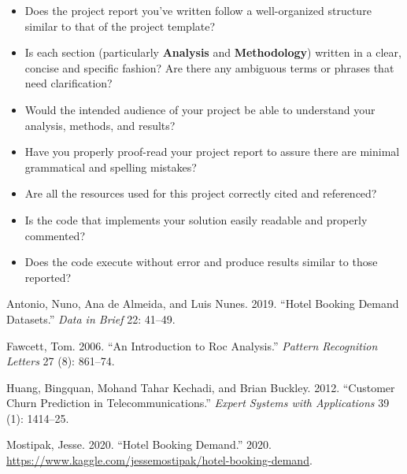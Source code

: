 \documentclass[
]{article}
\providecommand{\tightlist}{%
  \setlength{\itemsep}{0pt}\setlength{\parskip}{0pt}}
\begin{document}
\begin{itemize}
\tightlist
\item
  Does the project report you've written follow a well-organized
  structure similar to that of the project template?
\item
  Is each section (particularly \textbf{Analysis} and
  \textbf{Methodology}) written in a clear, concise and specific
  fashion? Are there any ambiguous terms or phrases that need
  clarification?
\item
  Would the intended audience of your project be able to understand your
  analysis, methods, and results?
\item
  Have you properly proof-read your project report to assure there are
  minimal grammatical and spelling mistakes?
\item
  Are all the resources used for this project correctly cited and
  referenced?
\item
  Is the code that implements your solution easily readable and properly
  commented?
\item
  Does the code execute without error and produce results similar to
  those reported?
\end{itemize}

\hypertarget{refs}{}
\leavevmode\hypertarget{ref-antonio2019hotel}{}%
Antonio, Nuno, Ana de Almeida, and Luis Nunes. 2019. ``Hotel Booking
Demand Datasets.'' \emph{Data in Brief} 22: 41--49.

\leavevmode\hypertarget{ref-fawcett2006introduction}{}%
Fawcett, Tom. 2006. ``An Introduction to Roc Analysis.'' \emph{Pattern
Recognition Letters} 27 (8): 861--74.

\leavevmode\hypertarget{ref-huang2012customer}{}%
Huang, Bingquan, Mohand Tahar Kechadi, and Brian Buckley. 2012.
``Customer Churn Prediction in Telecommunications.'' \emph{Expert
Systems with Applications} 39 (1): 1414--25.

\leavevmode\hypertarget{ref-kaggle}{}%
Mostipak, Jesse. 2020. ``Hotel Booking Demand.'' 2020.
\url{https://www.kaggle.com/jessemostipak/hotel-booking-demand}.
\end{document}
